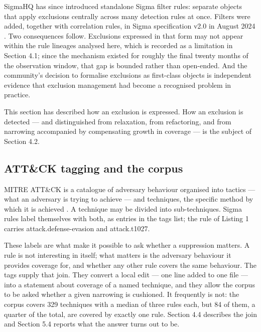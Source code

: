 SigmaHQ has since introduced standalone Sigma filter rules: separate objects that apply exclusions centrally across many detection rules at once. Filters were added, together with correlation rules, in Sigma specification v2.0 in August 2024 \citep{sigmahq2024}. Two consequences follow. Exclusions expressed in that form may not appear within the rule lineages analysed here, which is recorded as a limitation in Section 4.1; since the mechanism existed for roughly the final twenty months of the observation window, that gap is bounded rather than open-ended. And the community's decision to formalise exclusions as first-class objects is independent evidence that exclusion management had become a recognised problem in practice.

This section has described how an exclusion is expressed. How an exclusion is detected --- and distinguished from relaxation, from refactoring, and from narrowing accompanied by compensating growth in coverage --- is the subject of Section 4.2.

\subsection{ATT\&CK tagging and the corpus}

MITRE ATT\&CK is a catalogue of adversary behaviour organised into tactics --- what an adversary is trying to achieve --- and techniques, the specific method by which it is achieved \citep{strom2020}. A technique may be divided into sub-techniques. Sigma rules label themselves with both, as entries in the tags list; the rule of Listing 1 carries attack.defense-evasion and attack.t1027.

These labels are what make it possible to ask whether a suppression matters. A rule is not interesting in itself; what matters is the adversary behaviour it provides coverage for, and whether any other rule covers the same behaviour. The tags supply that join. They convert a local edit --- one line added to one file --- into a statement about coverage of a named technique, and they allow the corpus to be asked whether a given narrowing is cushioned. It frequently is not: the corpus covers 329 techniques with a median of three rules each, but 84 of them, a quarter of the total, are covered by exactly one rule. Section 4.4 describes the join and Section 5.4 reports what the answer turns out to be.

